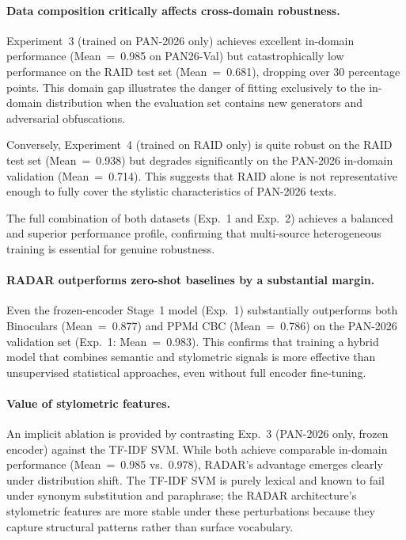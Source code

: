 \paragraph{Data composition critically affects cross-domain robustness.}
Experiment~3 (trained on PAN-2026 only) achieves excellent in-domain performance
(Mean~=~0.985 on PAN26-Val) but catastrophically low performance on the RAID test set
(Mean~=~0.681), dropping over 30 percentage points. This domain gap illustrates
the danger of fitting exclusively to the in-domain distribution when the evaluation
set contains new generators and adversarial obfuscations.

Conversely, Experiment~4 (trained on RAID only) is quite robust on the RAID test set
(Mean~=~0.938) but degrades significantly on the PAN-2026 in-domain validation
(Mean~=~0.714). This suggests that RAID alone is not representative enough to fully
cover the stylistic characteristics of PAN-2026 texts.

The full combination of both datasets (Exp.~1 and Exp.~2) achieves a balanced and
superior performance profile, confirming that multi-source heterogeneous training is
essential for genuine robustness.

\paragraph{RADAR outperforms zero-shot baselines by a substantial margin.}
Even the frozen-encoder Stage~1 model (Exp.~1) substantially outperforms both
Binoculars (Mean~=~0.877) and PPMd CBC (Mean~=~0.786) on the PAN-2026 validation set
(Exp.~1: Mean~=~0.983). This confirms that training a hybrid model that combines
semantic and stylometric signals is more effective than unsupervised statistical
approaches, even without full encoder fine-tuning.

\paragraph{Value of stylometric features.}
An implicit ablation is provided by contrasting Exp.~3 (PAN-2026 only, frozen encoder)
against the TF-IDF SVM. While both achieve comparable in-domain performance (Mean~=~0.985
vs.~0.978), RADAR's advantage emerges clearly under distribution shift. The TF-IDF SVM
is purely lexical and known to fail under synonym substitution and paraphrase; the RADAR
architecture's stylometric features are more stable under these perturbations because
they capture structural patterns rather than surface vocabulary.

